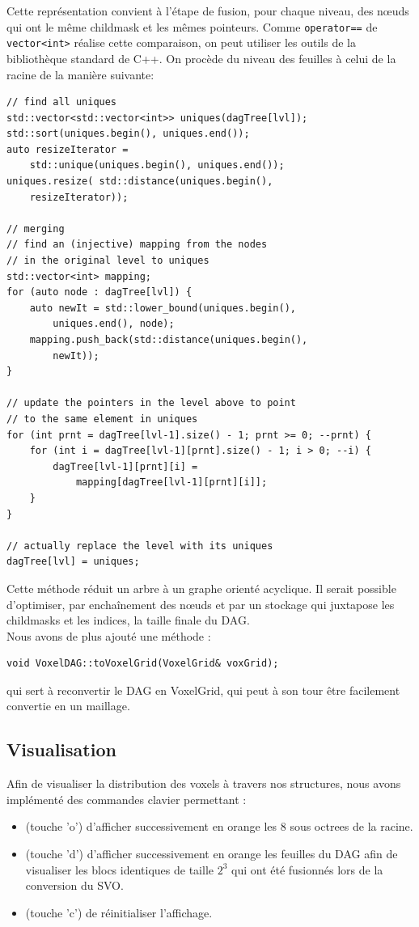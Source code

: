 \documentclass[a4paper]{article}
\begin{document}
Cette représentation convient à l'étape de fusion, pour chaque niveau, des nœuds qui ont le même childmask et les mêmes pointeurs. Comme \texttt{operator==} de \texttt{vector<int>} réalise cette comparaison, on peut utiliser les outils de la bibliothèque standard de C++. On procède du niveau des feuilles à celui de la racine de la manière suivante: \\

\begin{lstlisting}
// find all uniques
std::vector<std::vector<int>> uniques(dagTree[lvl]);
std::sort(uniques.begin(), uniques.end());
auto resizeIterator = 
	std::unique(uniques.begin(), uniques.end());
uniques.resize( std::distance(uniques.begin(),
	resizeIterator));

// merging
// find an (injective) mapping from the nodes
// in the original level to uniques
std::vector<int> mapping;
for (auto node : dagTree[lvl]) {
    auto newIt = std::lower_bound(uniques.begin(), 
    	uniques.end(), node);
    mapping.push_back(std::distance(uniques.begin(),
    	newIt));
}

// update the pointers in the level above to point
// to the same element in uniques
for (int prnt = dagTree[lvl-1].size() - 1; prnt >= 0; --prnt) {
    for (int i = dagTree[lvl-1][prnt].size() - 1; i > 0; --i) {
        dagTree[lvl-1][prnt][i] = 
        	mapping[dagTree[lvl-1][prnt][i]];
    }
}

// actually replace the level with its uniques
dagTree[lvl] = uniques;
\end{lstlisting}
Cette méthode réduit un arbre à un graphe orienté acyclique. Il serait possible d'optimiser, par enchaînement des nœuds et par un stockage qui juxtapose les childmasks et les indices, la taille finale du DAG.\\


Nous avons de plus ajouté une méthode :
\begin{lstlisting}
void VoxelDAG::toVoxelGrid(VoxelGrid& voxGrid);
\end{lstlisting}
qui sert à reconvertir le DAG en VoxelGrid, qui peut à son tour être facilement convertie en un maillage.

\subsection{Visualisation} %
\label{sub:visualisation}

Afin de visualiser la distribution des voxels à travers nos structures, nous avons implémenté des commandes clavier permettant :
\begin{itemize}
 \item (touche 'o') d'afficher successivement en orange les 8 sous octrees de la racine. 
 \item (touche 'd') d'afficher successivement en orange les feuilles du DAG afin de visualiser les blocs identiques de taille $2^3$ qui ont été fusionnés lors de la conversion du SVO.
 \item (touche 'c') de réinitialiser l'affichage.
\end{itemize}
\end{document}

